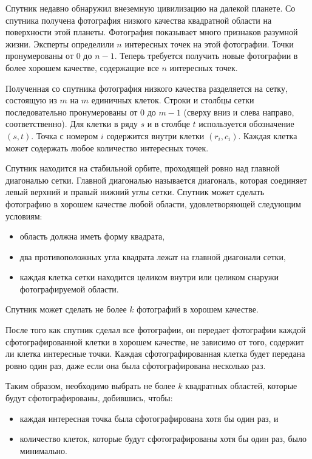 Спутник недавно обнаружил внеземную цивилизацию на далекой планете. Со
спутника получена фотография низкого качества квадратной области на
поверхности этой планеты. Фотография показывает много признаков разумной
жизни. Эксперты определили $n$ интересных точек на этой фотографии. Точки
пронумерованы от $0$ до $n - 1$. Теперь требуется получить новые фотографии в
более хорошем качестве, содержащие все $n$ интересных точек.


Полученная со спутника фотография низкого качества разделяется на сетку,
состоящую из $m$ на $m$ единичных клеток. Строки и столбцы сетки
последовательно пронумерованы от $0$ до $m - 1$ (сверху вниз и слева направо,
соответственно). Для клетки в ряду $s$ и в столбце $t$ используется обозначение $(s, t)$. Точка с номером $i$ содержится внутри клетки $(r_i, c_i)$. Каждая клетка
может содержать любое количество интересных точек.


Спутник находится на стабильной орбите, проходящей ровно над главной
диагональю сетки. Главной диагональю называется диагональ, которая
соединяет левый верхний и правый нижний углы сетки. Спутник может сделать
фотографию в хорошем качестве любой области, удовлетворяющей следующим
условиям:

\begin{itemize}
  \item область должна иметь форму квадрата,
  \item два противоположных угла квадрата лежат на главной диагонали сетки,
  \item каждая клетка сетки находится целиком внутри или целиком снаружи фотографируемой области.
\end{itemize}


Спутник может сделать не более $k$ фотографий в хорошем качестве.


После того как спутник сделал все фотографии, он передает фотографии каждой
сфотографированной клетки в хорошем качестве, не зависимо от того, содержит
ли клетка интересные точки. Каждая сфотографированная клетка будет
передана ровно один раз, даже если она была сфотографирована несколько раз.


Таким образом, необходимо выбрать не более $k$ квадратных областей, которые
будут сфотографированы, добившись, чтобы:

\begin{itemize}
  \item каждая интересная точка была сфотографирована хотя бы один раз, и
  \item количество клеток, которые будут сфотографированы хотя бы один раз, было минимально.
\end{itemize}


